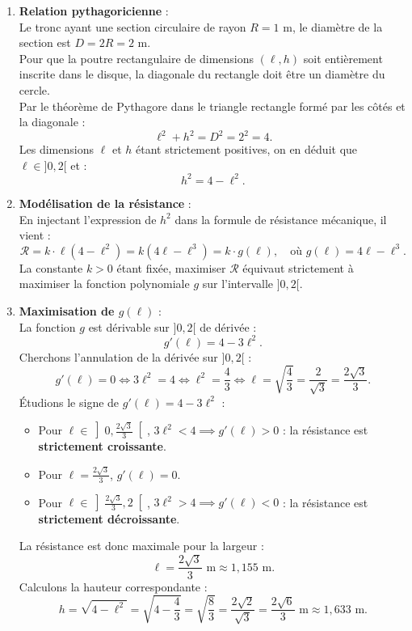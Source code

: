 \documentclass[11pt,a4paper]{article}
\begin{document}
\begin{correctionbox}
\begin{enumerate}[label=\textbf{\arabic*.}]
    \item \textbf{Relation pythagoricienne} :\\
    Le tronc ayant une section circulaire de rayon $R = 1\text{ m}$, le diamètre de la section est $D = 2R = 2\text{ m}$.\\
    Pour que la poutre rectangulaire de dimensions $(\ell, h)$ soit entièrement inscrite dans le disque, la diagonale du rectangle doit être un diamètre du cercle.\\
    Par le théorème de Pythagore dans le triangle rectangle formé par les côtés et la diagonale :
    \[
    \ell^2 + h^2 = D^2 = 2^2 = 4.
    \]
    Les dimensions $\ell$ et $h$ étant strictement positives, on en déduit que $\ell \in ]0, 2[$ et :
    \[
    h^2 = 4 - \ell^2.
    \]

    \item \textbf{Modélisation de la résistance} :\\
    En injectant l'expression de $h^2$ dans la formule de résistance mécanique, il vient :
    \[
    \mathcal{R} = k \cdot \ell(4 - \ell^2) = k(4\ell - \ell^3) = k \cdot g(\ell), \quad \text{où } g(\ell) = 4\ell - \ell^3.
    \]
    La constante $k > 0$ étant fixée, maximiser $\mathcal{R}$ équivaut strictement à maximiser la fonction polynomiale $g$ sur l'intervalle $]0, 2[$.

    \item \textbf{Maximisation de $g(\ell)$} :\\
    La fonction $g$ est dérivable sur $]0, 2[$ de dérivée :
    \[
    g'(\ell) = 4 - 3\ell^2.
    \]
    Cherchons l'annulation de la dérivée sur $]0, 2[$ :
    \[
    g'(\ell) = 0 \iff 3\ell^2 = 4 \iff \ell^2 = \frac{4}{3} \iff \ell = \sqrt{\frac{4}{3}} = \frac{2}{\sqrt{3}} = \frac{2\sqrt{3}}{3}.
    \]
    Étudions le signe de $g'(\ell) = 4 - 3\ell^2$ :
    \begin{itemize}
        \item Pour $\ell \in \left]0, \frac{2\sqrt{3}}{3}\right[$, $3\ell^2 < 4 \implies g'(\ell) > 0$ : la résistance est \textbf{strictement croissante}.
        \item Pour $\ell = \frac{2\sqrt{3}}{3}$, $g'(\ell) = 0$.
        \item Pour $\ell \in \left]\frac{2\sqrt{3}}{3}, 2\right[$, $3\ell^2 > 4 \implies g'(\ell) < 0$ : la résistance est \textbf{strictement décroissante}.
    \end{itemize}
    La résistance est donc maximale pour la largeur :
    \[
    \ell = \frac{2\sqrt{3}}{3}\text{ m} \approx 1{,}155\text{ m}.
    \]
    Calculons la hauteur correspondante :
    \[
    h = \sqrt{4 - \ell^2} = \sqrt{4 - \frac{4}{3}} = \sqrt{\frac{8}{3}} = \frac{2\sqrt{2}}{\sqrt{3}} = \frac{2\sqrt{6}}{3}\text{ m} \approx 1{,}633\text{ m}.
    \]


\end{enumerate}
\end{correctionbox}
\end{document}

